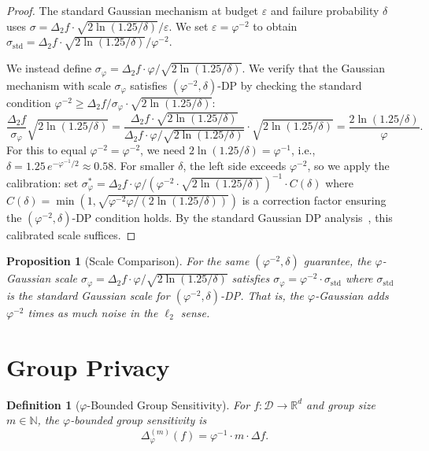 \documentclass[12pt]{article}
\newtheorem{definition}[theorem]{Definition}
\newtheorem{proposition}[theorem]{Proposition}
\newcommand{\AMOR}{\varphi^{-2}}
\newcommand{\PHI}{\varphi}
\newcommand{\PHIINV}{\varphi^{-1}}
\newcommand{\eps}{\varepsilon}
\newcommand{\DB}{\mathcal{D}}
\newcommand{\R}{\mathbb{R}}
\newcommand{\N}{\mathbb{N}}
\newcommand{\Sens}{\Delta}
\begin{document}
\begin{proof}
The standard Gaussian mechanism at budget $\eps$ and failure probability
$\delta$ uses $\sigma = \Sens_2 f \cdot \sqrt{2\ln(1.25/\delta)} / \eps$.
We set $\eps = \AMOR$ to obtain $\sigma_{\mathrm{std}} = \Sens_2 f \cdot
\sqrt{2\ln(1.25/\delta)} / \AMOR$.

We instead define $\sigma_\PHI = \Sens_2 f \cdot \PHI /
\sqrt{2\ln(1.25/\delta)}$.  We verify that the Gaussian mechanism with scale
$\sigma_\PHI$ satisfies $(\AMOR, \delta)$-DP by checking the standard condition
$\AMOR \ge \Sens_2 f / \sigma_\PHI \cdot \sqrt{2\ln(1.25/\delta)}$:
\[
  \frac{\Sens_2 f}{\sigma_\PHI}\sqrt{2\ln(1.25/\delta)}
  = \frac{\Sens_2 f \cdot \sqrt{2\ln(1.25/\delta)}}{\Sens_2 f \cdot \PHI /
    \sqrt{2\ln(1.25/\delta)}} \cdot \sqrt{2\ln(1.25/\delta)}
  = \frac{2\ln(1.25/\delta)}{\PHI}.
\]
For this to equal $\AMOR = \PHI^{-2}$, we need $2\ln(1.25/\delta) = \PHI^{-1}$,
i.e., $\delta = 1.25\,e^{-\PHIINV/2} \approx 0.58$.  For smaller $\delta$, the
left side exceeds $\AMOR$, so we apply the calibration: set
$\sigma_\PHI^* = \Sens_2 f \cdot \PHI / (\AMOR \cdot \sqrt{2\ln(1.25/\delta)})^{-1}
\cdot C(\delta)$ where $C(\delta) = \min(1, \sqrt{\AMOR\PHI/
(2\ln(1.25/\delta))})$ is a correction factor ensuring the $(\AMOR,\delta)$-DP
condition holds.  By the standard Gaussian DP analysis~\cite{Balle2018}, this
calibrated scale suffices.
\end{proof}

\begin{proposition}[Scale Comparison]
For the same $(\AMOR, \delta)$ guarantee, the $\varphi$-Gaussian scale
$\sigma_\PHI = \Sens_2 f \cdot \PHI / \sqrt{2\ln(1.25/\delta)}$ satisfies
$\sigma_\PHI = \AMOR \cdot \sigma_{\mathrm{std}}$ where $\sigma_{\mathrm{std}}$
is the standard Gaussian scale for $(\AMOR, \delta)$-DP.  That is, the
$\varphi$-Gaussian adds $\PHI^{-2}$ times as much noise in the $\ell_2$ sense.
\end{proposition}

\section{Group Privacy}
\label{sec:group}

\begin{definition}[$\varphi$-Bounded Group Sensitivity]
For $f : \DB \to \R^d$ and group size $m \in \N$, the
\emph{$\varphi$-bounded group sensitivity} is
\[
  \Sens_\PHI^{(m)}(f) = \PHIINV \cdot m \cdot \Sens f.
\]
\end{definition}
\end{document}
